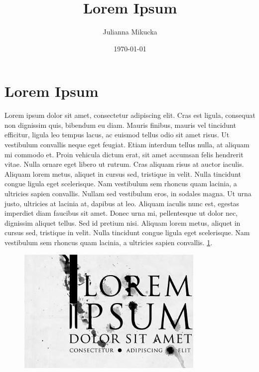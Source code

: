 \documentclass[a4paper,12pt]{article}
\title{Lorem Ipsum}
\author{Julianna Mikucka}
\date{\today}
\begin{document}
\maketitle
\setcounter{tocdepth}{2} %

\begin{flushleft}

\tableofcontents
\end{flushleft}

\newpage


\section{\textbf{Lorem Ipsum}}

Lorem ipsum dolor sit amet, consectetur adipiscing elit. Cras est ligula, consequat non dignissim quis, bibendum eu diam. Mauris finibus, mauris vel tincidunt efficitur, ligula leo tempus lacus, ac euismod tellus odio sit amet risus. Ut vestibulum convallis neque eget feugiat. Etiam interdum tellus nulla, at aliquam mi commodo et. Proin vehicula dictum erat, sit amet accumsan felis hendrerit vitae. Nulla ornare eget libero ut rutrum. Cras aliquam risus at auctor iaculis. Aliquam lorem metus, aliquet in cursus sed, tristique in velit. Nulla tincidunt congue ligula eget scelerisque. Nam vestibulum sem rhoncus quam lacinia, a ultricies sapien convallis. Nullam sed vestibulum eros, in sodales magna. Ut urna justo, ultricies at lacinia at, dapibus at leo. Aliquam iaculis nunc est, egestas imperdiet diam faucibus sit amet. Donec urna mi, pellentesque ut dolor nec, dignissim aliquet tellus. Sed id pretium nisi. Aliquam lorem metus, aliquet in cursus sed, tristique in velit. Nulla tincidunt congue ligula eget scelerisque. Nam vestibulum sem rhoncus quam lacinia, a ultricies sapien convallis. \ref{fig:lorem}. 

\begin{figure}[h!]
\centering 
\includegraphics[width=0.8\textwidth]{loremipsum.jpg}
\caption{\label{fig:lorem}}
\end{figure}
\end{document}
